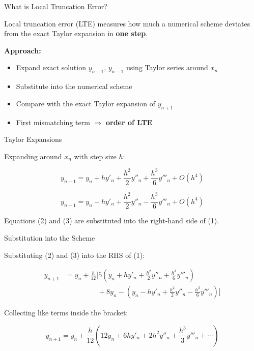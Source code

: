 \documentclass{beamer}
\begin{document}
\begin{frame}{What is Local Truncation Error?}

Local truncation error (LTE) measures how much a numerical scheme deviates from the exact Taylor expansion in \textbf{one step}.

\vspace{0.4cm}

\textbf{Approach:}
\begin{itemize}
    \item Expand exact solution $y_{n+1}$, $y_{n-1}$ using Taylor series around $x_n$
    \item Substitute into the numerical scheme
    \item Compare with the exact Taylor expansion of $y_{n+1}$
    \item First mismatching term $\Rightarrow$ \textbf{order of LTE}
\end{itemize}

\end{frame}

\begin{frame}{Taylor Expansions}

Expanding around $x_n$ with step size $h$:

\begin{equation}
    y_{n+1} = y_n + h y'_n + \frac{h^2}{2}y''_n + \frac{h^3}{6}y'''_n + O(h^4)
\end{equation}

\begin{equation}
    y_{n-1} = y_n - h y'_n + \frac{h^2}{2}y''_n - \frac{h^3}{6}y'''_n + O(h^4)
\end{equation}

\vspace{0.3cm}
Equations (2) and (3) are substituted into the right-hand side of (1).

\end{frame}

\begin{frame}{Substitution into the Scheme}

Substituting (2) and (3) into the RHS of (1):

\begin{equation}
\begin{aligned}
    y_{n+1} &= y_n + \frac{h}{12} \Big[
    5\!\left(y_n + h y'_n + \tfrac{h^2}{2}y''_n + \tfrac{h^3}{6}y'''_n\right) \\
    &\quad\quad\quad\quad\;\; + 8y_n
    - \!\left(y_n - h y'_n + \tfrac{h^2}{2}y''_n - \tfrac{h^3}{6}y'''_n\right)
    \Big]
\end{aligned}
\end{equation}

Collecting like terms inside the bracket:

\begin{equation}
    y_{n+1} = y_n + \frac{h}{12}\!\left(12y_n + 6h y'_n + 2h^2 y''_n + \frac{h^3}{3}y'''_n + \cdots\right)
\end{equation}

\end{frame}
\end{document}
